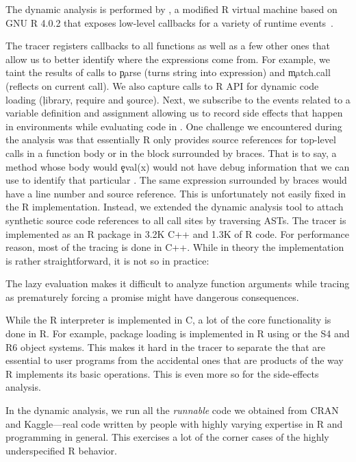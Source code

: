 \documentclass[review,nonacm,screen,acmsmall,anonymous=true]{acmart}
\begin{document}
The dynamic analysis is performed by \rdyntrace, a modified R virtual machine
based on GNU R 4.0.2 that exposes low-level callbacks for a variety of runtime
events~\cite{oopsla19b}.

The tracer registers callbacks to all \eval functions as well as a few other
ones that allow us to better identify where the expressions come from. For
example, we taint the results of calls to \c{parse} (turns string into
expression) and \c{match.call} (reflects on current call). We also capture calls
to R API for dynamic code loading (\eg\xspace \c{library}, \c{require} and
\c{source}). Next, we subscribe to the events related to a variable definition
and assignment allowing us to record side effects that happen in environments
while evaluating code in \eval. One challenge we encountered during the analysis
was that essentially R only provides source references for top-level calls in a
function body or in the block surrounded by braces. That is to say, a method
whose body would \c{eval(x)} would not have debug information that we can use to
identify that particular \eval. The same expression surrounded by braces would
have a line number and source reference. This is unfortunately not easily fixed
in the R implementation. Instead, we extended the dynamic analysis tool to
attach synthetic source code references to all \eval call sites by traversing
ASTs. The tracer is implemented as an R package in 3.2K C++ and 1.3K of R code.
For performance reason, most of the tracing is done in C++. While in theory the
implementation is rather straightforward, it is not so in practice:
%
\begin{compactitem}[---]

\item The lazy evaluation makes it difficult to analyze function arguments
  while tracing as prematurely forcing a promise might have dangerous
  consequences.

\item While the R interpreter is implemented in C, a lot of the core
  functionality is done in R. For example, package loading is implemented in R
  using \eval or the S4 and R6 object systems. This makes it hard in the tracer
  to separate the \eval that are essential to user programs from the
  accidental ones that are products of the way R implements its basic
  operations. This is even more so for the side-effects analysis.

\item In the dynamic analysis, we run all the \emph{runnable} code we obtained
  from CRAN and Kaggle---\ie real code written by people with highly varying
  expertise in R and programming in general. This exercises a lot of the corner
  cases of the highly underspecified R behavior.

\end{compactitem}
\end{document}
